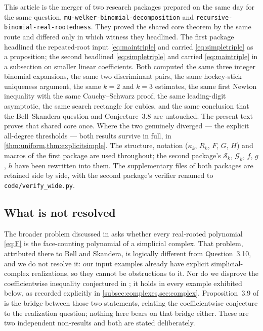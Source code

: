 \documentclass[11pt,letterpaper]{article}
\numberwithin{equation}{section}
\theoremstyle{definition}
\theoremstyle{remark}
\newcommand{\kap}{\kappa}
\begin{document}
This article is the merger of two research packages prepared on the same day
for the same question, \texttt{mu-welker-binomial-decomposition} and
\texttt{recursive-binomial-real-rootedness}. They proved the shared core
theorem by the same route and differed only in which witness they headlined.
The first package headlined the repeated-root input \eqref{eq:maintriple} and
carried \eqref{eq:simpletriple} as a proposition; the second headlined
\eqref{eq:simpletriple} and carried \eqref{eq:maintriple} in a subsection on
smaller linear coefficients. Both computed the same three integer binomial
expansions, the same two discriminant pairs, the same hockey-stick uniqueness
argument, the same $k=2$ and $k=3$ estimates, the same first Newton
inequality with the same Cauchy--Schwarz proof, the same leading-digit
asymptotic, the same search rectangle for cubics, and the same conclusion that
the Bell--Skandera question and Conjecture~3.8 are untouched. The present text
proves that shared core once. Where the two genuinely diverged --- the
explicit all-degree thresholds --- both results survive in full, in
\cref{thm:uniform,thm:explicitsimple}. The structure, notation
($\kap_k$, $R_k$, $F$, $G$, $H$) and macros of the first package are used
throughout; the second package's $\mathcal S_k$, $\mathcal G_k$, $f$, $g$, $h$
have been rewritten into them. The supplementary files of both packages are
retained side by side, with the second package's verifier renamed to
\texttt{code/verify\_wide.py}.

\subsection{What is not resolved}\label{subsec:notresolved}

The broader problem discussed in \cite[Question~1.1]{MW} asks whether every
real-rooted polynomial \eqref{eq:F} is the face-counting polynomial of a
simplicial complex. That problem, attributed there to Bell and Skandera, is
logically different from Question~3.10, and we do not resolve it: our input
examples already have explicit simplicial-complex realizations, so they cannot
be obstructions to it. Nor do we disprove the coefficientwise inequality
conjectured in \cite[Conjecture~3.8]{MW}; it holds in every example exhibited
below, as recorded explicitly in \cref{subsec:complexes,sec:complex}.
Proposition~3.9 of \cite{MW} is the bridge between those two statements,
relating the coefficientwise conjecture to the realization question; nothing
here bears on that bridge either. These are two independent non-results and
both are stated deliberately.
\end{document}

